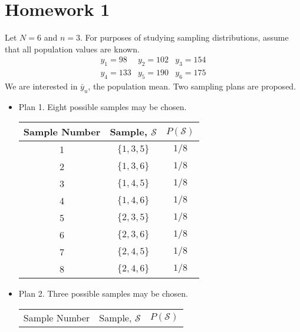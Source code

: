 \documentclass[12pt]{article}
\begin{document}

    
    \section{Homework 1}

    \begin{exercise}[Lohr-2.1]
        Let $N = 6$ and $n = 3$. For purposes of studying sampling distributions, assume that all population values are known. 
        \[
            \begin{array}{cll}
            y_{1}=98 & y_{2}=102 & y_{3}=154 \\
            y_{4}=133 & y_{5}=190 & y_{6}=175
            \end{array}
        \]
        We are interested in \(\bar{y}_u\), the population mean. Two sampling plans are proposed. 
        \begin{itemize}
            \item Plan 1. Eight possible samples may be chosen. 
            \begin{center}
                \begin{tabular}{ccc} 
                    Sample Number & Sample, \(\mathcal{S}\) & \(P(\mathcal{S})\) \\
                    \hline 1 & \(\{1,3,5\}\) & \(1 / 8\) \\
                    2 & \(\{1,3,6\}\) & \(1 / 8\) \\
                    3 & \(\{1,4,5\}\) & \(1 / 8\) \\
                    4 & \(\{1,4,6\}\) & \(1 / 8\) \\
                    5 & \(\{2,3,5\}\) & \(1 / 8\) \\
                    6 & \(\{2,3,6\}\) & \(1 / 8\) \\
                    7 & \(\{2,4,5\}\) & \(1 / 8\) \\
                    8 & \(\{2,4,6\}\) & \(1 / 8\)
                \end{tabular}
            \end{center}
            \item Plan 2. Three possible samples may be chosen.
            \begin{center}
                \begin{tabular}{ccc} 
                    Sample Number & Sample, \(\mathcal{S}\) & \(P(\mathcal{S})\) \\

\end{tabular}
\end{center}
\end{itemize}
\end{exercise}
\end{document}
